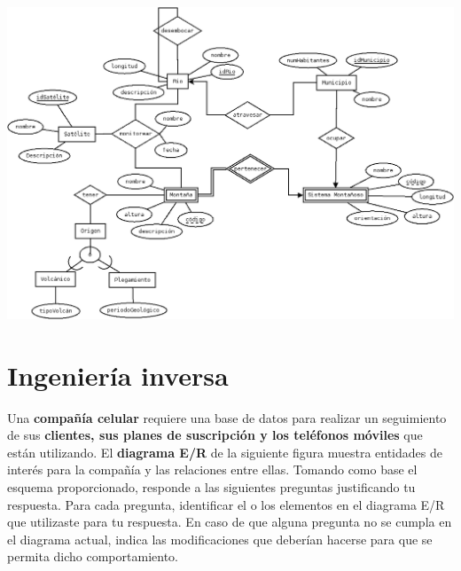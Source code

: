 \documentclass[12pt, letterpaper]{article}
\begin{document}
            \includegraphics[scale=0.4]{sistema_infog.png}

    \section{Ingeniería inversa}

    Una \textbf{compañía celular} requiere una base de datos para realizar un 
    seguimiento de sus \textbf{clientes, sus planes de suscripción y los 
    teléfonos móviles} que están utilizando. El \textbf{diagrama E/R} de la 
    siguiente figura muestra entidades de interés para la compañía y las 
    relaciones entre ellas. Tomando como base el esquema proporcionado, 
    responde a las siguientes preguntas justificando tu respuesta. Para cada 
    pregunta, identificar el o los elementos en el diagrama E/R que utilizaste 
    para tu respuesta. En caso de que alguna pregunta no se cumpla en el 
    diagrama actual, indica las modificaciones que deberían hacerse para que 
    se permita dicho comportamiento. 
\end{document}
